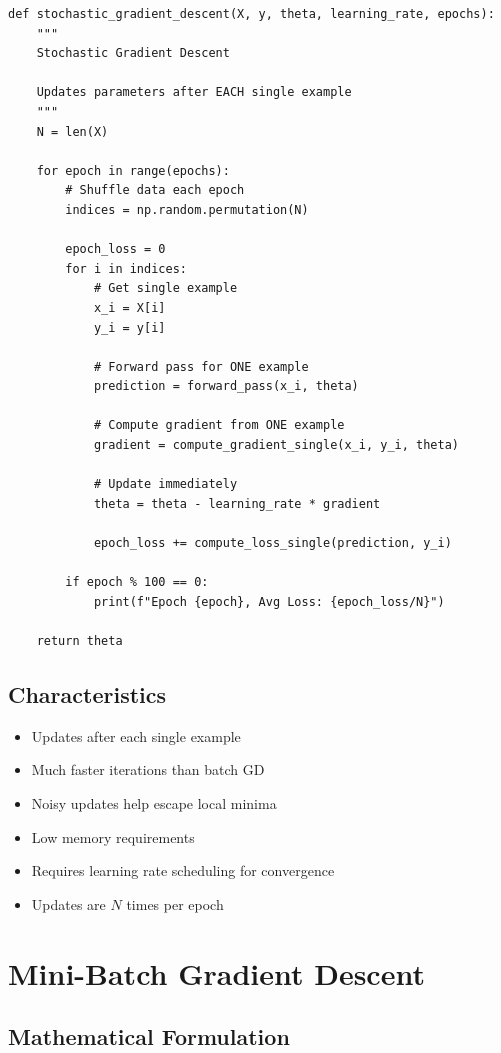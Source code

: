 \documentclass{tufte-handout}
\begin{document}
\begin{lstlisting}
def stochastic_gradient_descent(X, y, theta, learning_rate, epochs):
    """
    Stochastic Gradient Descent
    
    Updates parameters after EACH single example
    """
    N = len(X)
    
    for epoch in range(epochs):
        # Shuffle data each epoch
        indices = np.random.permutation(N)
        
        epoch_loss = 0
        for i in indices:
            # Get single example
            x_i = X[i]
            y_i = y[i]
            
            # Forward pass for ONE example
            prediction = forward_pass(x_i, theta)
            
            # Compute gradient from ONE example
            gradient = compute_gradient_single(x_i, y_i, theta)
            
            # Update immediately
            theta = theta - learning_rate * gradient
            
            epoch_loss += compute_loss_single(prediction, y_i)
        
        if epoch % 100 == 0:
            print(f"Epoch {epoch}, Avg Loss: {epoch_loss/N}")
    
    return theta
\end{lstlisting}

\subsection{Characteristics}
\begin{itemize}
    \item Updates after each single example
    \item Much faster iterations than batch GD
    \item Noisy updates help escape local minima
    \item Low memory requirements
    \item Requires learning rate scheduling for convergence
    \item Updates are $N$ times per epoch
\end{itemize}

\section{Mini-Batch Gradient Descent}

\subsection{Mathematical Formulation}
\end{document}
